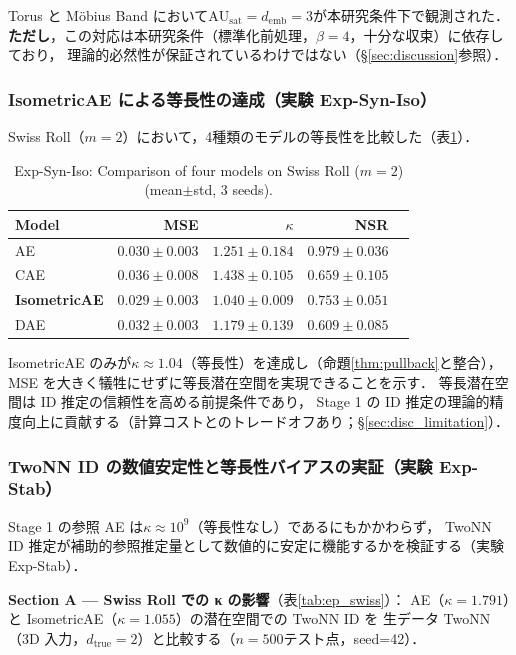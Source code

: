 \documentclass[11pt,a4paper]{jsarticle}
\newcommand{\kap}{\kappa}
\newcommand{\AUsat}{\mathrm{AU}_{\mathrm{sat}}}
\newcommand{\demb}{d_{\mathrm{emb}}}
\begin{document}
Torus と Möbius Band において$\AUsat = \demb = 3$が本研究条件下で観測された．
\textbf{ただし}，この対応は本研究条件（標準化前処理，$\beta = 4$，十分な収束）に依存しており，
理論的必然性が保証されているわけではない（§\ref{sec:discussion}参照）．

\subsubsection{IsometricAE による等長性の達成（実験 Exp-Syn-Iso）}

Swiss Roll（$m = 2$）において，4種類のモデルの等長性を比較した（表\ref{tab:ec}）．

\begin{table}[H]
\centering
\caption{Exp-Syn-Iso: Comparison of four models on Swiss Roll ($m=2$) (mean$\pm$std, 3 seeds).}
\label{tab:ec}
\small
\begin{tabular}{lrrrr}
\toprule
Model & MSE & $\kap$ & NSR \\
\midrule
AE & $0.030\pm0.003$ & $1.251\pm0.184$ & $0.979\pm0.036$ \\
CAE & $0.036\pm0.008$ & $1.438\pm0.105$ & $0.659\pm0.105$ \\
\textbf{IsometricAE} & $\boldsymbol{0.029\pm0.003}$ & $\boldsymbol{1.040\pm0.009}$ & $0.753\pm0.051$ \\
DAE & $0.032\pm0.003$ & $1.179\pm0.139$ & $0.609\pm0.085$ \\
\bottomrule
\end{tabular}
\end{table}

IsometricAE のみが$\kap \approx 1.04$（等長性）を達成し（命題\ref{thm:pullback}と整合），
MSE を大きく犠牲にせずに等長潜在空間を実現できることを示す．
等長潜在空間は ID 推定の信頼性を高める前提条件であり，
Stage 1 の ID 推定の理論的精度向上に貢献する（計算コストとのトレードオフあり；§\ref{sec:disc_limitation}）．

\subsubsection{TwoNN ID の数値安定性と等長性バイアスの実証（実験 Exp-Stab）}\label{sec:exp_ep}

Stage 1 の参照 AE は$\kap \approx 10^9$（等長性なし）であるにもかかわらず，
TwoNN ID 推定が補助的参照推定量として数値的に安定に機能するかを検証する（実験 Exp-Stab）．

\textbf{Section A — Swiss Roll での κ の影響}（表\ref{tab:ep_swiss}）：
AE（$\kap = 1.791$）と IsometricAE（$\kap = 1.055$）の潜在空間での TwoNN ID を
生データ TwoNN（3D 入力，$d_\mathrm{true}=2$）と比較する（$n=500$テスト点，seed=42）．
\end{document}
